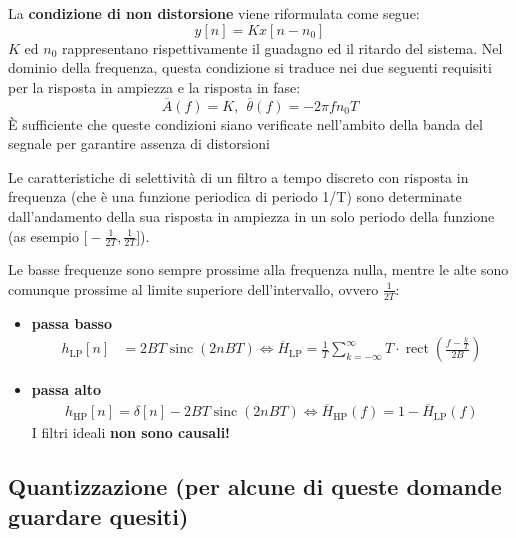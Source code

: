 \documentclass[
]{article}
\providecommand{\tightlist}{%
  \setlength{\itemsep}{0pt}\setlength{\parskip}{0pt}}
\begin{document}
\begin{enumerate}
  La \textbf{condizione di non distorsione} viene riformulata come
  segue: \[
  y[n]=Kx[n-n_0]
  \] \(K\) ed \(n_0\) rappresentano rispettivamente il guadagno ed il
  ritardo del sistema. Nel dominio della frequenza, questa condizione si
  traduce nei due seguenti requisiti per la risposta in ampiezza e la
  risposta in fase: \[
  \overline{A}(f) = K, \ \ \overline{\theta}(f)=-2\pi fn_{0}T
  \] È sufficiente che queste condizioni siano verificate nell'ambito
  della banda del segnale per garantire assenza di distorsioni

  Le caratteristiche di selettività di un filtro a tempo discreto con
  risposta in frequenza (che è una funzione periodica di periodo 1/T)
  sono determinate dall'andamento della sua risposta in ampiezza in un
  solo periodo della funzione (as esempio
  \(\Big[-\frac{1}{2T}, \frac{1}{2T}\Big]\)).

  Le basse frequenze sono sempre prossime alla frequenza nulla, mentre
  le alte sono comunque prossime al limite superiore dell'intervallo,
  ovvero \(\frac{1}{2T}\):

  \begin{itemize}
  \tightlist
  \item
    \textbf{passa basso} \begin{align*}
      h_{\text{LP}}[n] &= 2BT \mathop{\mathrm{sinc}}(2nBT) \Longleftrightarrow \overline{H}_{\text{LP}} = \frac{1}{T}\sum_{k=-\infty}^{\infty} T \cdot \operatorname{rect}\left(\frac{f-\frac{k}{T}}{2 B}\right)
      \end{align*}
  \item
    \textbf{passa alto} \begin{align*}
      h_{\text{HP}}[n] = \delta[n] -2BT\mathop{\mathrm{sinc}}(2nBT) \Longleftrightarrow \overline{H}_{\text{HP}}(f) = 1- \overline{H}_{\text{LP}}(f) 
      \end{align*} I filtri ideali \textbf{non sono causali!}
  \end{itemize}
\end{enumerate}

\subsection{Quantizzazione (per alcune di queste domande guardare
quesiti)}\label{quantizzazione-per-alcune-di-queste-domande-guardare-quesiti}
\end{document}

